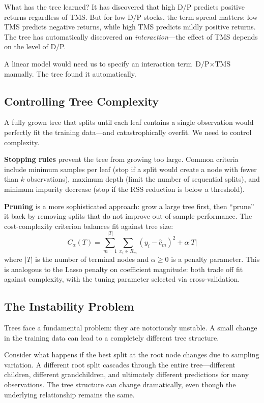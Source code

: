 \documentclass[11pt,a4paper]{article}
\newcommand{\keyword}[1]{\textbf{\textcolor{AccentOrange}{#1}}}
\begin{document}
What has the tree learned? It has discovered that high D/P predicts positive returns regardless of TMS. But for low D/P stocks, the term spread matters: low TMS predicts negative returns, while high TMS predicts mildly positive returns. The tree has automatically discovered an \emph{interaction}---the effect of TMS depends on the level of D/P.

A linear model would need us to specify an interaction term $\text{D/P} \times \text{TMS}$ manually. The tree found it automatically.

\subsection{Controlling Tree Complexity}

A fully grown tree that splits until each leaf contains a single observation would perfectly fit the training data---and catastrophically overfit. We need to control complexity.

\textbf{Stopping rules} prevent the tree from growing too large. Common criteria include minimum samples per leaf (stop if a split would create a node with fewer than $k$ observations), maximum depth (limit the number of sequential splits), and minimum impurity decrease (stop if the RSS reduction is below a threshold).

\keyword{Pruning} is a more sophisticated approach: grow a large tree first, then ``prune'' it back by removing splits that do not improve out-of-sample performance. The cost-complexity criterion balances fit against tree size:
\[
C_\alpha(T) = \sum_{m=1}^{|T|} \sum_{x_i \in R_m} (y_i - \widehat{c}_m)^2 + \alpha |T|
\]
where $|T|$ is the number of terminal nodes and $\alpha \geq 0$ is a penalty parameter. This is analogous to the Lasso penalty on coefficient magnitude: both trade off fit against complexity, with the tuning parameter selected via cross-validation.

\subsection{The Instability Problem}

Trees face a fundamental problem: they are notoriously unstable. A small change in the training data can lead to a completely different tree structure.

Consider what happens if the best split at the root node changes due to sampling variation. A different root split cascades through the entire tree---different children, different grandchildren, and ultimately different predictions for many observations. The tree structure can change dramatically, even though the underlying relationship remains the same.
\end{document}
